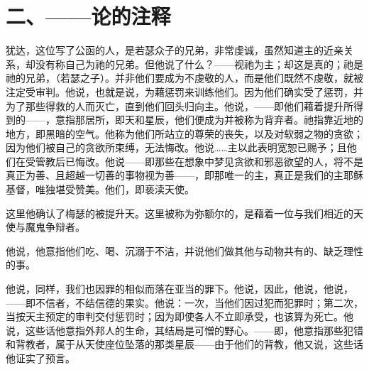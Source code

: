 \section{二、——论的注释}

犹达，这位写了公函的人，是若瑟众子的兄弟，非常虔诚，虽然知道主的近亲关系，却没有称自己为祂的兄弟。但他说了什么？——视祂为主；却这是真的；祂是祂的兄弟，（若瑟之子）。并非他们要成为不虔敬的人，而是他们既然不虔敬，就被注定受审判。他说，也就是说，为藉惩罚来训练他们。因为他们确实受了惩罚，并为了那些得救的人而灭亡，直到他们回头归向主。他说，——即他们藉着提升所得到的——，意指那居所，即天和星辰，他们便成为并被称为背弃者。祂指靠近地的地方，即黑暗的空气。他称为他们所站立的尊荣的丧失，以及对软弱之物的贪欲；因为他们被自己的贪欲所束缚，无法悔改。他说……主以此表明宽恕已赐予；且他们在受管教后已悔改。他说——即那些在想象中梦见贪欲和邪恶欲望的人，将不是真正为善、且超越一切善的事物视为善——，即那唯一的主，真正是我们的主耶稣基督，唯独堪受赞美。他们，即亵渎天使。\par

这里他确认了梅瑟的被提升天。这里被称为弥额尔的，是藉着一位与我们相近的天使与魔鬼争辩者。\par

他说，他意指他们吃、喝、沉溺于不洁，并说他们做其他与动物共有的、缺乏理性的事。\par

他说，同样，我们也因罪的相似而落在亚当的罪下。他说，因此，他说，他说，——即不信者，不结信德的果实。他说：一次，当他们因过犯而犯罪时；第二次，当按天主预定的审判交付惩罚时；因为即使各人不立即承受，也该算为死亡。他说，这些话他意指外邦人的生命，其结局是可憎的野心。——即，他意指那些犯错和背教者，属于从天使座位坠落的那类星辰——由于他们的背教，他又说，这些话他证实了预言。\par


